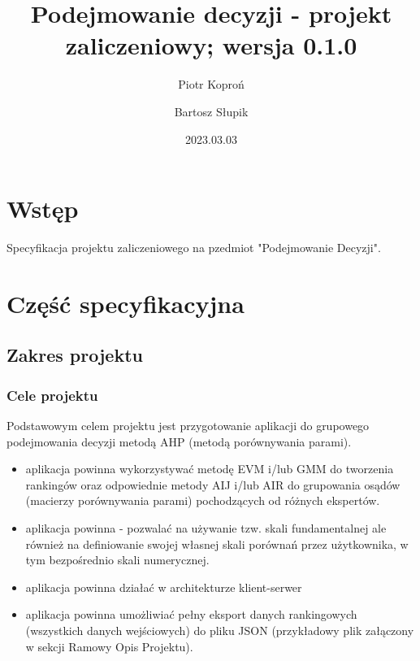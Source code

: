 \documentclass{article}
\author{Piotr Koproń \and Bartosz Słupik}
\date{2023.03.03}
\title{Podejmowanie decyzji - projekt zaliczeniowy; wersja 0.1.0}
\begin{document}
\maketitle
\newpage

\section{Wstęp}
Specyfikacja projektu zaliczeniowego na pzedmiot "Podejmowanie Decyzji".
\section{Część specyfikacyjna}
\subsection{Zakres projektu}
\subsubsection{Cele projektu}
Podstawowym celem projektu jest przygotowanie aplikacji do grupowego podejmowania decyzji metodą AHP (metodą porównywania parami). \\
\begin{itemize}
\item aplikacja powinna wykorzystywać metodę EVM i/lub GMM do tworzenia rankingów oraz odpowiednie metody AIJ i/lub AIR do grupowania osądów (macierzy porównywania parami) pochodzących od różnych ekspertów. 
\item aplikacja powinna - pozwalać na używanie tzw. skali fundamentalnej ale również na definiowanie swojej własnej skali porównań przez użytkownika, w tym bezpośrednio skali numerycznej. 
\item aplikacja powinna działać w architekturze klient-serwer 
\item aplikacja powinna umożliwiać pełny eksport danych rankingowych (wszystkich danych wejściowych) do pliku JSON (przykładowy plik załączony w sekcji Ramowy Opis Projektu).
\end{itemize}
\end{document}
